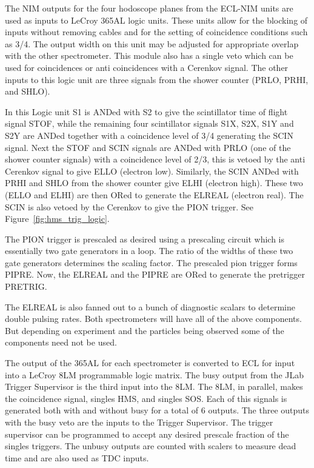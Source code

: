 The NIM outputs for the four hodoscope planes from the ECL-NIM units are
used as inputs to LeCroy 365AL logic units. These units allow for the
blocking of inputs without removing cables and for the setting of coincidence
conditions such as 3/4. The output width on this unit may be adjusted for
appropriate overlap with the other spectrometer. This module also has a
single veto which can be used for coincidences or anti coincidences with a
Cerenkov signal. The other inputs to this logic unit are three signals
from the shower counter (PRLO, PRHI, and SHLO).

In this Logic unit S1 is ANDed with S2 to give the scintillator time of flight
signal STOF, while the remaining four scintillator signals S1X, S2X, S1Y and S2Y
are ANDed together with a coincidence level of 3/4 generating the SCIN
signal. Next the STOF and SCIN signals are ANDed with PRLO (one of the shower
counter signals) with a coincidence level of 2/3, this is vetoed by the
anti Cerenkov signal to give ELLO (electron low). Similarly, the SCIN ANDed with
PRHI and SHLO from the shower counter give  ELHI (electron high). These two
(ELLO and ELHI) are then ORed to generate the ELREAL (electron real). The SCIN
is also vetoed by the Cerenkov to give the PION trigger. See Figure~\ref{fig:hms_trig_logic}.

The PION trigger is
prescaled as desired using a prescaling circuit which is essentially two gate
generators in a loop. The ratio of the widths of these two gate generators
determines the scaling factor. The prescaled pion trigger forms PIPRE. Now, the
ELREAL and the PIPRE are ORed to generate the pretrigger PRETRIG.

The ELREAL is also fanned out to a bunch of diagnostic scalars to
determine double pulsing rates. Both spectrometers will have all
of the above components. But depending on experiment and the particles
being observed some of the components need not be used.

The output of the 365AL for each spectrometer is converted to ECL for
input into a LeCroy 8LM programmable logic matrix. The busy output from
the JLab Trigger Supervisor is the third input into the 8LM.  The
8LM, in parallel, makes the coincidence signal, singles HMS, and
singles SOS.  Each of this signals is generated both with and without
busy for a total of 6 outputs. The three outputs with the busy veto are
the inputs to the Trigger Supervisor. The trigger supervisor can be programmed
to accept any desired prescale fraction of the singles triggers. The unbusy
outputs are counted with scalers to measure dead time and are also used as TDC
inputs.

